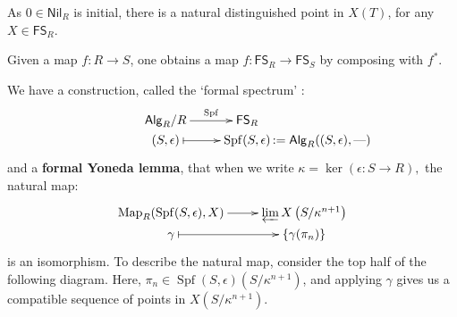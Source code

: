 \documentclass[11pt]{article}
\newcommand{\RAlg}{\mathsf{Alg}_R}
\newcommand{\RNil}{\mathsf{Nil}_R}
\newcommand{\FSR}{\mathsf{FS}_R}
\newcommand{\FSS}{\mathsf{FS}_S}
\DeclareMathOperator{\SPf}{Spf}
\begin{document}
\begin{itemise}
As $0\in\RNil$ is initial, there is a natural distinguished point in $X(T)$, for any $X\in\FSR$.

\item Given a map $f:R\to S$, one obtains a map $f:\FSR\to\FSS$ by composing with $f^*$.
\item We have a construction, called the `formal spectrum' :
\[\xymatrix@R=0mm{
\ar[r]^-{\SPf}%
\RAlg/R&%
\FSR\\%
(S,\epsilon)%
\ar@{|->}[r]&
\SPf(S,\epsilon)\makebox[0cm][l]{\,$:=\RAlg((S,\epsilon),\DASH )$}%
}\qquad \qquad \]
and a \textbf{formal Yoneda lemma}, that when we write $\kappa=\ker (\epsilon:S\to R),$ the natural map:
\[\xymatrix@R=0mm{
\ar[r]^-{}%
\Map_R(\SPf(S,\epsilon),X)&%
\varprojlim X\left(S/\kappa^{n+1}\right)\\%
\gamma%
\ar@{|->}[r]&
\{\gamma(\pi_n)\}%
}\]
is an isomorphism. 
To describe the natural map, consider the top half of the following diagram. Here, $\pi_n\in\SPf(S,\epsilon)(S/\kappa^{n+1})$, and applying $\gamma$ gives us a compatible sequence of points in $X(S/\kappa^{n+1})$.


\end{itemise}
\end{document}
